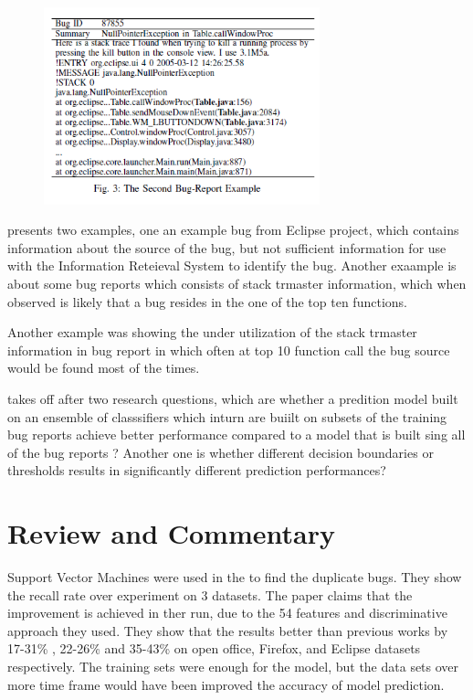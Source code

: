 \documentclass[]{sig-alternate-05-2015}
\begin{document}
\begin{figure}[h]
\includegraphics[width=8cm]{fig61}
\end{figure}

\cite{Wong} presents two examples, one an example bug from Eclipse project, which contains information about the source of the bug, but not sufficient information for use with the Information Reteieval System to identify the bug. Another exaample is about some bug reports which consists of stack trmaster information, which when observed is likely that a bug resides in the one of the top ten functions. \newline

Another example was showing the under utilization of the stack trmaster information in bug report in which often at top 10 function call the bug source would be found most of the times. \newline

\cite{Tian2013} takes off after two research questions, which are whether a predition model built on an ensemble of classsifiers which inturn are buiilt on subsets of the training bug reports achieve better performance compared to a model that is built sing all of the bug reports ? Another one is whether different decision boundaries or thresholds results in significantly different prediction performances? 

\section{Review and Commentary} 
Support Vector Machines were used in the \cite{Sun2010} to find the duplicate bugs. They show the recall rate over experiment on 3 datasets. The paper claims that the improvement is achieved in ther run, due to the 54 features and discriminative approach they used. They show that the results better than previous works by 17-31\% , 22-26\% and 35-43\% on open office, Firefox, and Eclipse datasets respectively. The training sets were enough for the model, but the data sets over more time frame would have been improved the accuracy of model prediction. \newline
\end{document}
